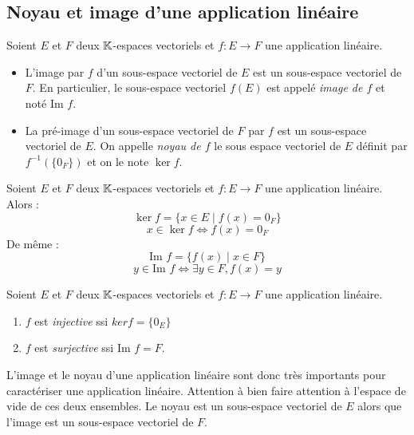 \subsection{Noyau et image d'une application linéaire}

\begin{proposition}
    Soient $E$ et $F$ deux $\mathbb{K}$-espaces vectoriels et $f : E \longrightarrow F$ une application 
    linéaire.
    \begin{itemize}
        \item L'image par $f$ d'un sous-espace vectoriel de $E$ est un sous-espace vectoriel de $F$. 
        En particulier, le sous-espace vectoriel $f(E)$ est appelé \emph{image de $f$} et noté $ \text{Im } f$. 
        \item La pré-image d'un sous-espace vectoriel de $F$ par $f$ est un sous-espace vectoriel de $E$. 
        On appelle \emph{noyau de $f$} le sous espace vectoriel de $E$ définit par $f^{-1}(\{0_F\})$ 
        et on le note $\ker f$. 
    \end{itemize}
\end{proposition}

\begin{remark}
    Soient $E$ et $F$ deux $\mathbb{K}$-espaces vectoriels et $f : E \longrightarrow F$ une application 
    linéaire. Alors : 
        \[ \ker f = \{x \in E \; | \; f(x) = 0_F\} \] 
        \[ x \in \ker f \iff f(x) = 0_F \] 
    De même : 
        \[ \text{Im } f = \{f(x) \; | \; x \in F\} \] 
        \[ y \in \text{Im } f \iff \exists y \in F, f(x) = y \] 
\end{remark}


\begin{theorem}
    Soient $E$ et $F$ deux $\mathbb{K}$-espaces vectoriels et $f : E \longrightarrow F$ une application 
    linéaire. 
    \begin{enumerate}
        \item $f$ est \emph{injective} ssi $ ker f = \{0_E\}$ 
        \item $f$ est \emph{surjective} ssi $ \text{Im } f = F$. 
    \end{enumerate}
\end{theorem}

L'image et le noyau d'une application linéaire sont donc très importants pour caractériser une application linéaire. 
Attention à bien faire attention à l'espace de vide de ces deux ensembles. 
Le noyau est un sous-espace vectoriel de $E$ alors que l'image est un sous-espace vectoriel de $F$. 

